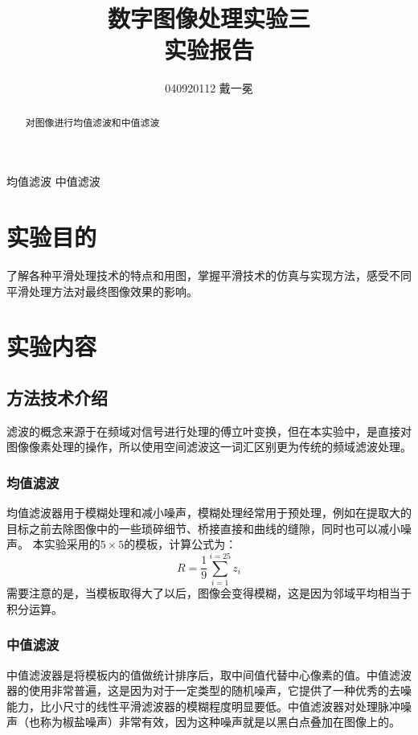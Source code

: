 \documentclass[]{IEEEphot}
\begin{document}
\title{数字图像处理实验三\\实验报告}
\author{040920112 戴一冕}
\maketitle
{}

\begin{abstract}
对图像进行均值滤波和中值滤波
\end{abstract}

\begin{IEEEkeywords}
均值滤波 中值滤波
\end{IEEEkeywords}

\section{实验目的}
了解各种平滑处理技术的特点和用图，掌握平滑技术的仿真与实现方法，感受不同平滑处理方法对最终图像效果的影响。
\section{实验内容}
\subsection{方法技术介绍}
滤波的概念来源于在频域对信号进行处理的傅立叶变换，但在本实验中，是直接对图像像素处理的操作，所以使用空间滤波这一词汇区别更为传统的频域滤波处理。
\subsubsection{均值滤波}
均值滤波器用于模糊处理和减小噪声，模糊处理经常用于预处理，例如在提取大的目标之前去除图像中的一些琐碎细节、桥接直接和曲线的缝隙，同时也可以减小噪声。
本实验采用的$5\times5$的模板，计算公式为：
\begin{equation}
	R=\frac{1}{9}\sum_{i=1}^{i=25}z_i
\end{equation}
需要注意的是，当模板取得大了以后，图像会变得模糊，这是因为邻域平均相当于积分运算。
\subsubsection{中值滤波}
中值滤波器是将模板内的值做统计排序后，取中间值代替中心像素的值。中值滤波器的使用非常普遍，这是因为对于一定类型的随机噪声，它提供了一种优秀的去噪能力，比小尺寸的线性平滑滤波器的模糊程度明显要低。中值滤波器对处理脉冲噪声（也称为椒盐噪声）非常有效，因为这种噪声就是以黑白点叠加在图像上的。
\end{document}
